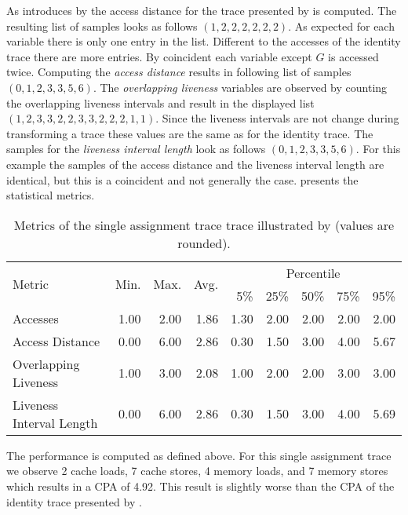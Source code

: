\documentclass[onecolumn, openright, master, english, signatures]{dbrgrptt}
\begin{document}
As introduces by  the access distance for the \ac{trace} presented by  is computed. The resulting list of samples looks as follows $(1, 2, 2, 2, 2, 2, 2)$. As expected for each variable there is only one entry in the list. Different to the accesses of the identity \ac{trace} there are more entries. By coincident each variable except $G$ is accessed twice. Computing the \emph{access distance} results in following list of samples $(0, 1, 2, 3, 3, 5, 6)$. The \emph{overlapping liveness} variables are observed by counting the overlapping liveness intervals and result in the displayed list $(1, 2, 3, 3, 2, 2, 3, 3, 2, 2, 2, 1, 1)$. Since the liveness intervals are not change during transforming a \ac{trace} these values are the same as for the identity \ac{trace}. The samples for the \emph{liveness interval length} look as follows $(0, 1, 2, 3, 3, 5, 6)$. For this example the samples of the access distance and the liveness interval length are identical, but this is a coincident and not generally the case.  presents the statistical metrics.

\begin{table}[!ht]
  \centering
  \begin{tabular}{lrrrrrrrr}
    \hline
    \multirow{2}{*}{Metric} & \multirow{2}{*}{Min.} & \multirow{2}{*}{Max.} & \multirow{2}{*}{Avg.} & \multicolumn{5}{c}{Percentile} \tabularnewline
    & & & & 5\% & 25\% & 50\% & 75\% & 95\% \tabularnewline
    \hline
    Accesses                 & 1.00 & 2.00 & 1.86 & 1.30 & 2.00 & 2.00 & 2.00 & 2.00 \\
    Access Distance          & 0.00 & 6.00 & 2.86 & 0.30 & 1.50 & 3.00 & 4.00 & 5.67 \\
    Overlapping Liveness        & 1.00 & 3.00 & 2.08 & 1.00 & 2.00 & 2.00 & 3.00 & 3.00 \\
    Liveness Interval Length & 0.00 & 6.00 & 2.86 & 0.30 & 1.50 & 3.00 & 4.00 & 5.69 \\
    \hline
  \end{tabular}
  \caption{Metrics of the single assignment trace \ac{trace} illustrated by  (values are rounded).}
  \label{tab:summarizing-example-metrics-sa}
\end{table}

The performance is computed as defined above. For this single assignment trace we observe 2 cache loads, 7 cache stores, 4 memory loads, and 7 memory stores which results in a \ac{CPA} of 4.92. This result is slightly worse than the \ac{CPA} of the identity \ac{trace} presented by .
\end{document}

